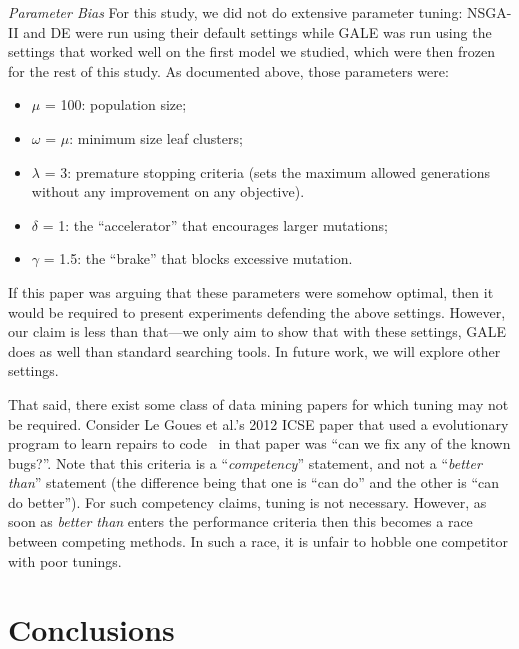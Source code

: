 \documentclass{sig-alternative}
\begin{document}
{\em Parameter Bias} 
For this study, we did not do extensive parameter tuning:
NSGA-II and DE were run using their default
settings while GALE was run using the settings that
worked well on the first model we studied, which were
then frozen for the rest of this study. As documented
above, those parameters were:
\begin{itemize}
\item $\mu$ = 100: population size;
\item $\omega$ = $\mu$: minimum size leaf clusters;
\item $\lambda$ = 3: premature stopping criteria (sets the maximum
allowed generations without any improvement
on any objective).
\item $\delta$ = 1: the ``accelerator'' that encourages larger
mutations;
\item $\gamma$ = 1.5: the ``brake'' that blocks excessive mutation.
\end{itemize}

If this paper was arguing that these parameters were
somehow optimal, then it would be required to present
experiments defending the above settings. However, our
claim is less than that—we only aim to show that with
these settings, GALE does as well than standard searching
tools. In future work, we will explore other settings.




That said, there exist some class of data mining papers for which
tuning may not be required. Consider  Le Goues et al.'s 2012
ICSE paper that used a evolutionary program to learn
repairs to code~
in that paper was ``can we fix any of the known bugs?''. Note
that this criteria is a ``{\em competency}'' statement, and
not a ``{\em better than}'' statement (the difference being that
one is 
``can do'' and the other is ``can do better''). For such
competency claims, tuning is not necessary. However, as soon
as {\em better than} enters the performance criteria then this
becomes a race between competing methods. In such a race,
it is unfair to hobble one competitor with poor tunings.



\section{Conclusions}
\end{document}
